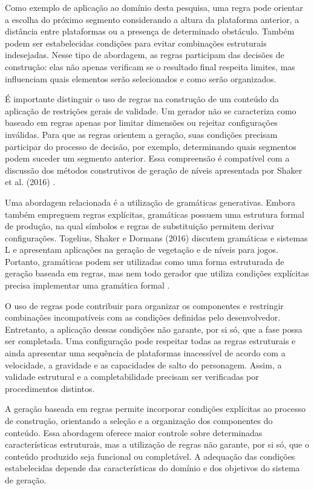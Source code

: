 Como exemplo de aplicação ao domínio desta pesquisa,
uma regra pode orientar a escolha do próximo segmento considerando
a altura da plataforma anterior, a distância entre
plataformas ou a presença de determinado obstáculo.
Também podem ser estabelecidas condições para evitar
combinações estruturais indesejadas. Nesse tipo de
abordagem, as regras participam das decisões de
construção: elas não apenas verificam se o resultado
final respeita limites, mas influenciam quais elementos
serão selecionados e como serão organizados.

É importante distinguir o uso de regras na construção
de um conteúdo da aplicação de restrições gerais de
validade. Um gerador não se caracteriza como baseado
em regras apenas por limitar dimensões ou rejeitar
configurações inválidas. Para que as regras orientem
a geração, suas condições precisam participar do
processo de decisão, por exemplo, determinando quais
segmentos podem suceder um segmento anterior. Essa
compreensão é compatível com a discussão dos métodos
construtivos de geração de níveis apresentada por
Shaker et al. (2016) \cite{ShakerConstructive2016}.

Uma abordagem relacionada é a utilização de gramáticas
generativas. Embora também empreguem regras explícitas,
gramáticas possuem uma estrutura formal de produção,
na qual símbolos e regras de substituição permitem
derivar configurações. Togelius, Shaker e Dormans
(2016) discutem gramáticas e sistemas L e apresentam
aplicações na geração de vegetação e de níveis para
jogos. Portanto, gramáticas podem ser utilizadas como
uma forma estruturada de geração baseada em regras,
mas nem todo gerador que utiliza condições explícitas
precisa implementar uma gramática formal
\cite{TogeliusGrammars2016}.

O uso de regras pode contribuir para organizar os
componentes e restringir combinações incompatíveis
com as condições definidas pelo desenvolvedor.
Entretanto, a aplicação dessas condições não garante,
por si só, que a fase possa ser completada. Uma
configuração pode respeitar todas as regras estruturais
e ainda apresentar uma sequência de plataformas
inacessível de acordo com a velocidade, a gravidade
e as capacidades de salto do personagem. Assim,
a validade estrutural e a completabilidade precisam
ser verificadas por procedimentos distintos.

A geração baseada em regras permite incorporar condições explícitas ao 
processo de construção, orientando a seleção e a organização dos 
componentes do conteúdo. Essa abordagem oferece maior controle sobre 
determinadas características estruturais, mas a utilização de regras não 
garante, por si só, que o conteúdo produzido seja funcional ou completável. 
A adequação das condições estabelecidas depende das características do 
domínio e dos objetivos do sistema de geração.

